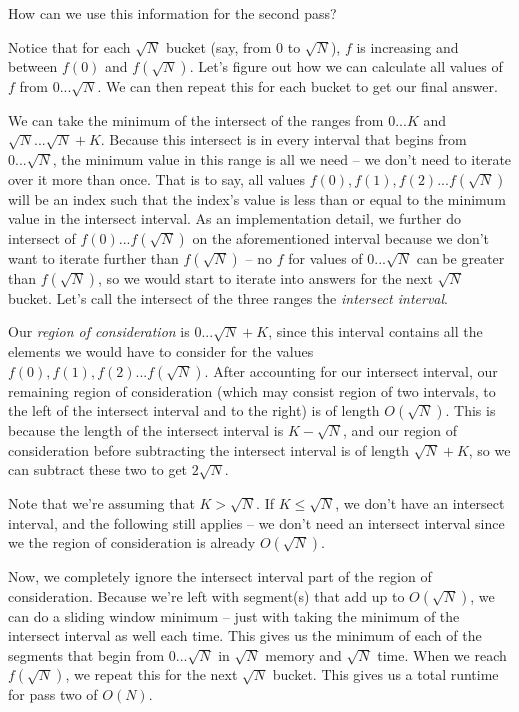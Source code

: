 \documentclass[11pt]{article}
\begin{document}
        How can we use this information for the second pass?
        
        Notice that for each $\sqrt N$ bucket (say, from $0$ to $\sqrt N$), $f$ is increasing and between $f(0)$ and $f(\sqrt N)$. Let's figure out how we can calculate all values of $f$ from $0...\sqrt N$. We can then repeat this for each bucket to get our final answer.
        
        
        We can take the minimum of the intersect of the ranges from $0...K$ and $\sqrt N ...\sqrt N + K$. Because this intersect is in every interval that begins from $0...\sqrt N$, the minimum value in this range is all we need -- we don't need to iterate over it more than once. That is to say, all values $f(0), f(1), f(2)...f(\sqrt N)$ will be an index such that the index's value is less than or equal to the minimum value in the intersect interval. As an implementation detail, we further do intersect of $f(0)...f(\sqrt N)$ on the aforementioned interval because we don't want to iterate further than $f(\sqrt N)$ -- no $f$ for values of $0...\sqrt N$ can be greater than $f(\sqrt N)$, so we would start to iterate into answers for the next $\sqrt N$ bucket. Let's call the intersect of the three ranges the \textit{intersect interval}.
        
        
        Our \textit{region of consideration} is $0 ... \sqrt N+K$, since this interval contains all the elements we would have to consider for the values $f(0), f(1), f(2)... f(\sqrt N)$. After accounting for our intersect interval, our remaining region of consideration (which may consist region of two intervals, to the left of the intersect interval and to the right) is of length $O(\sqrt N)$. This is because the length of the intersect interval is $K-\sqrt N$, and our region of consideration before subtracting the intersect interval is of length $\sqrt N+K$, so we can subtract these two to get $2 \sqrt N$.
        
        Note that we're assuming that $K > \sqrt N$. If $K \leq \sqrt N$, we don't have an intersect interval, and the following still applies -- we don't need an intersect interval since we the region of consideration is already $O(\sqrt N)$.
        
        Now, we completely ignore the intersect interval part of the region of consideration. Because we're left with segment(s) that add up to $O(\sqrt N)$, we can do a sliding window minimum -- just with taking the minimum of the intersect interval as well each time. This gives us the minimum of each of the segments that begin from $0...\sqrt N$ in $\sqrt N$ memory and $\sqrt N$ time. When we reach $f(\sqrt N)$, we repeat this for the next $\sqrt N$ bucket. This gives us a total runtime for pass two of $O(N)$.
        
\end{document}
